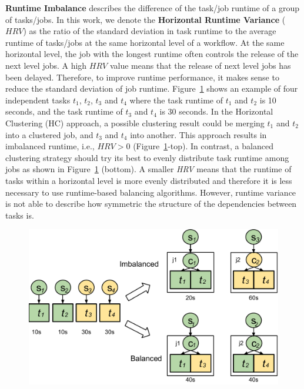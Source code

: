 \textbf{Runtime Imbalance} describes the difference of the task/job runtime of a group of tasks/jobs. In this work, we denote the \textbf{Horizontal Runtime Variance} ($HRV$) as the ratio of the standard deviation in task runtime to the average runtime of tasks/jobs at the same horizontal level of a workflow. At the same horizontal level, the job with the longest runtime often controls the release of the next level jobs. A high $HRV$ value means that the release of next level jobs has been delayed. Therefore, to improve runtime performance, it makes sense to reduce the standard deviation of job runtime. Figure~\ref{fig:imbalance_rv} shows an example of four independent tasks $t_1$, $t_2$, $t_3$ and $t_4$ where the task runtime of $t_1$ and $t_2$ is 10 seconds, and the task runtime of $t_3$ and $t_4$ is 30 seconds. In the Horizontal Clustering (HC) approach, a possible clustering result could be merging $t_1$ and $t_2$ into a clustered job, and $t_3$ and $t_4$ into another. This approach results in imbalanced runtime, i.e., $HRV > 0$ (Figure~\ref{fig:imbalance_rv}-top). In contrast, a balanced clustering strategy should try its best to evenly distribute task runtime among jobs as shown in Figure~\ref{fig:imbalance_rv} (bottom). A smaller \emph{HRV} means that the runtime of tasks within a horizontal level is more evenly distributed and therefore it is less necessary to use runtime-based balancing algorithms. However, runtime variance is not able to describe how symmetric the structure of the dependencies between tasks is.

\begin{figure}[htb]
	\centering
	\includegraphics[width=0.95\linewidth]{figures/balance/figure5.pdf}
	\label{fig:imbalance_rv}
\end{figure}


